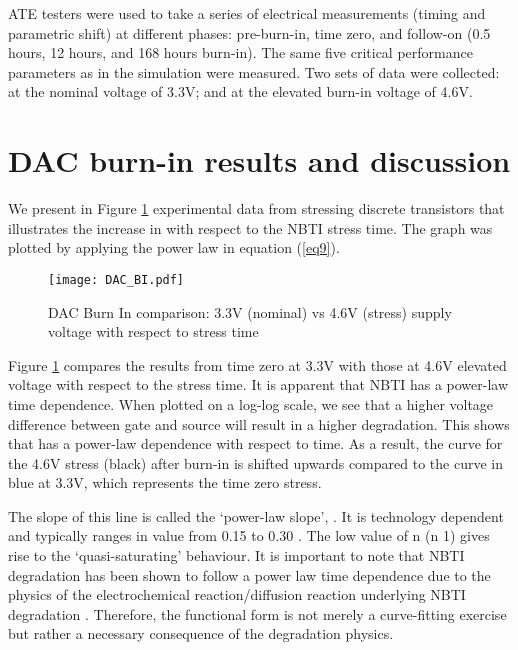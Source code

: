 \documentclass[11pt,a4paper]{article}
\begin{document}
ATE testers were used to take a series of electrical measurements (timing and parametric shift)   at different phases: pre-burn-in, time zero, and follow-on (0.5 hours, 12 hours, and 168 hours burn-in). The same five critical performance parameters as in the simulation were measured. Two sets of data were collected: at the nominal voltage of 3.3V; and at the elevated burn-in voltage of 4.6V.  

\section{DAC burn-in results and discussion}

We present in Figure \ref{figure 10} experimental data from stressing discrete transistors that illustrates the increase in  with respect to the NBTI stress time. The graph was plotted by applying the power law in equation (\ref{eq9}).
\begin{figure}[t]
\centering
\texttt{[image: DAC\_BI.pdf]}

\caption{DAC Burn In comparison: 3.3V (nominal) vs 4.6V (stress) supply voltage with respect to stress time}
\label{figure 10}
\end{figure}



Figure \ref{figure 10} compares the results from time zero at 3.3V with those at 4.6V elevated voltage with respect to the stress time.
It is apparent that NBTI has a power-law time dependence. When plotted on a log-log scale, we see that a higher voltage difference between gate and source will result in a higher degradation. This shows that  has a power-law dependence with respect to time. As a result, the curve for the 4.6V stress (black) after burn-in is shifted upwards compared to the curve in blue at 3.3V,  which represents the time zero stress. 

The slope of this line is called the `power-law slope', . It is technology dependent and typically ranges in value from 0.15 to 0.30 \cite{Schroder}. The low value of n (n  1) gives rise to the `quasi-saturating' behaviour. It is important to note that NBTI degradation has been shown to follow a power law time dependence due to the physics of the electrochemical reaction/diffusion reaction underlying NBTI degradation \cite{Schroder}. Therefore, the functional form is not merely a curve-fitting exercise but rather a necessary consequence of the degradation physics.
\end{document}
